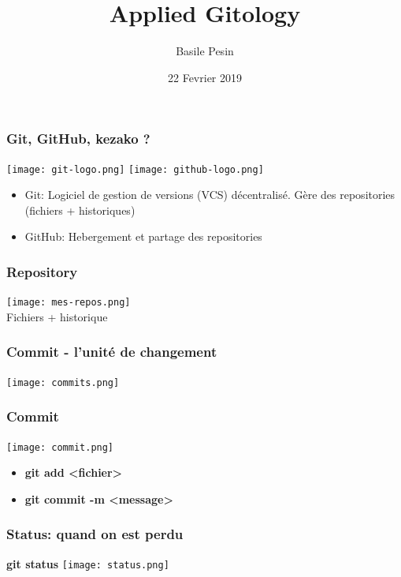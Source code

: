 \documentclass[aspectratio=169]{beamer}
\title{Applied Gitology}
\date{22 Fevrier 2019}
\author{Basile Pesin}
\begin{document}
\begin{frame}
\titlepage
\end{frame}

\begin{frame}
  \frametitle{Git, GitHub, kezako ?}
  \begin{center}
    \texttt{[image: git-logo.png]}\hspace{.1\paperwidth}
    \texttt{[image: github-logo.png]}
  \end{center}
  \begin{itemize}
  \item Git: Logiciel de gestion de versions (VCS) décentralisé. Gère des repositories (fichiers + historiques)
  \item GitHub: Hebergement et partage des repositories
  \end{itemize}
\end{frame}

\begin{frame}
  \frametitle{Repository}
  \begin{center}
      \texttt{[image: mes-repos.png]}\\\vspace{.02\paperheight}
    Fichiers + historique
  \end{center}
\end{frame}

\begin{frame}
  \frametitle{Commit - l'unité de changement}
  \begin{center}
    \texttt{[image: commits.png]}
  \end{center}
\end{frame}

\begin{frame}
  \frametitle{Commit}
  \begin{center}
    \texttt{[image: commit.png]}
  \end{center}
  \begin{itemize}
    \item \textbf{git add <fichier>}
    \item \textbf{git commit -m <message>}
  \end{itemize}
\end{frame}

\begin{frame}
  \frametitle{Status: quand on est perdu}
  \begin{center}
    \textbf{git status}\vspace{10px}
    \texttt{[image: status.png]}
  \end{center}
\end{frame}
\end{document}
